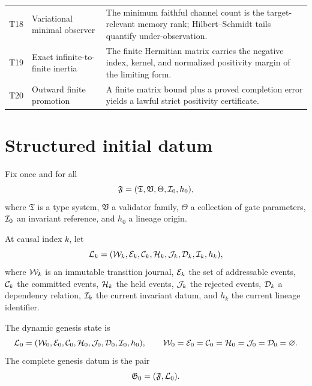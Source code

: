 \begin{longtable}{p{}p{}p{}}
T18 & Variational minimal observer & The minimum faithful channel count is the target-relevant memory rank; Hilbert--Schmidt tails quantify under-observation. \\
T19 & Exact infinite-to-finite inertia & The finite Hermitian matrix carries the negative index, kernel, and normalized positivity margin of the limiting form. \\
T20 & Outward finite promotion & A finite matrix bound plus a proved completion error yields a lawful strict positivity certificate. \\
\bottomrule
\end{longtable}

\section{Structured initial datum}

\begin{definition}
Fix once and for all
\begin{equation}
\mathfrak F=(\mathfrak T,\mathfrak V,\Theta,\mathcal I_0,h_0),
\label{eq:foundation}
\end{equation}
where $\mathfrak T$ is a type system, $\mathfrak V$ a validator family, $\Theta$ a collection of gate parameters, $\mathcal I_0$ an invariant reference, and $h_0$ a lineage origin.
\end{definition}

\begin{definition}
At causal index $k$, let
\begin{equation}
\mathcal L_k=(\mathcal W_k,\mathcal E_k,\mathcal C_k,\mathcal H_k,\mathcal J_k,\mathcal D_k,\mathcal I_k,h_k),
\label{eq:record}
\end{equation}
where $\mathcal W_k$ is an immutable transition journal, $\mathcal E_k$ the set of addressable events, $\mathcal C_k$ the committed events, $\mathcal H_k$ the held events, $\mathcal J_k$ the rejected events, $\mathcal D_k$ a dependency relation, $\mathcal I_k$ the current invariant datum, and $h_k$ the current lineage identifier.
\end{definition}

\begin{definition}
The dynamic genesis state is
\begin{equation}
\mathcal L_0=(\mathcal W_0,\mathcal E_0,\mathcal C_0,\mathcal H_0,\mathcal J_0,\mathcal D_0,\mathcal I_0,h_0),
\qquad
\mathcal W_0=\mathcal E_0=\mathcal C_0=\mathcal H_0=\mathcal J_0=\mathcal D_0=\varnothing.
\label{eq:initial}
\end{equation}
The complete genesis datum is the pair
\begin{equation}
\mathfrak G_0=(\mathfrak F,\mathcal L_0).
\label{eq:genesis-pair}
\end{equation}
\end{definition}

